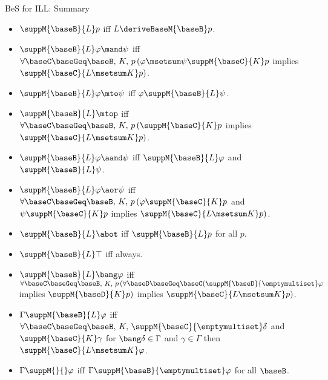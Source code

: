 \documentclass{beamer}
\begin{document}
\begin{frame}{BeS for ILL: Summary}
	\begin{itemize}
	\item $\suppM{\baseB}{L}p$ iff $L\deriveBaseM{\baseB}p$.
	\item $\suppM{\baseB}{L}\varphi\mand\psi$ iff $\forall\baseC\baseGeq\baseB,\, K,\,p\, (\varphi\msetsum\psi\suppM{\baseC}{K}p$ implies $\suppM{\baseC}{L\msetsum K}p)$.
	\item $\suppM{\baseB}{L}\varphi\mto\psi$ iff $\varphi\suppM{\baseB}{L}\psi$.
	\item $\suppM{\baseB}{L}\mtop$ iff $\forall\baseC\baseGeq\baseB,\, K,\,p\, (\suppM{\baseC}{K}p$ implies $\suppM{\baseC}{L\msetsum K}p)$.
	\item $\suppM{\baseB}{L}\varphi\aand\psi$ iff $\suppM{\baseB}{L}\varphi$ and $\suppM{\baseB}{L}\psi$.
	\item $\suppM{\baseB}{L}\varphi\aor\psi$ iff $\forall\baseC\baseGeq\baseB,\, K,\,p\, (\varphi\suppM{\baseC}{K}p$ and $\psi\suppM{\baseC}{K}p$ implies $\suppM{\baseC}{L\msetsum K}p)$.
	\item $\suppM{\baseB}{L}\abot$ iff $\suppM{\baseB}{L}p$ for all $p$.
	\item $\suppM{\baseB}{L}\top$ iff always.
	\item $\suppM{\baseB}{L}\bang\varphi$ iff \newline $\forall\baseC\baseGeq\baseB,\, K,\,p\, (\forall\baseD\baseGeq\baseC(\suppM{\baseD}{\emptymultiset}\varphi$ implies $\suppM{\baseD}{K}p)$ implies $\suppM{\baseC}{L\msetsum K}p)$.
	\item $\Gamma\suppM{\baseB}{L}\varphi$ iff \newline $\forall\baseC\baseGeq\baseB,\, K,\, \suppM{\baseC}{\emptymultiset}\delta$ and $\suppM{\baseC}{K}\gamma$ for $\bang\delta\in\Gamma$ and $\gamma\in\Gamma$ then $\suppM{\baseC}{L\msetsum K}\varphi$.
	\item $\Gamma\suppM{}{}\varphi$ iff $\Gamma\suppM{\baseB}{\emptymultiset}\varphi$ for all $\baseB$.
	\end{itemize}
\end{frame}
\end{document}
